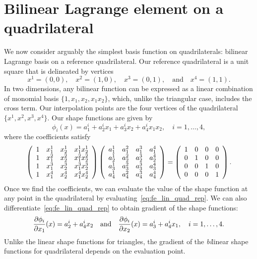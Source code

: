 \section{Bilinear Lagrange element on a quadrilateral}
We now consider arguably the simplest basis function on quadrilaterals: bilinear Lagrange basis on a reference quadrilateral.  Our reference quadrilateral is a unit square that is delineated by vertices
\begin{equation*}
  x^1 = (0,0), \quad x^2 = (1,0), \quad x^3 = (0,1), \quad \text{and} \quad x^4 = (1,1).
\end{equation*}
In two dimensions, any bilinear function can be expressed as a linear combination of monomial basis $\{ 1, x_1, x_2, x_1 x_2 \}$, which, unlike the triangular case, includes the cross term. Our interpolation points are the four vertices of the quadrilateral $\{ x^1, x^2, x^3, x^4 \}$.  Our shape functions are given by 
\begin{equation}
  \phi_i(x) = a_1^i + a_2^i x_1 + a_3^i x_2 + a_4^i x_1 x_2, \quad i = 1,\dots,4,
  \label{eq:fe_lin_quad_rep}
\end{equation}
where the coefficients satisfy
\begin{equation*}
  \bmat{cccc}
  1 & x_1^1 & x_2^1 & x_1^1 x_2^1 \\
  1 & x_1^2 & x_2^2 & x_1^2 x_2^2 \\
  1 & x_1^3 & x_2^3 & x_1^3 x_2^3 \\
  1 & x_1^4 & x_2^4 & x_1^4 x_2^4 \\
  \emat
  \bmat{cccc}
  a_1^1 & a_1^2 & a_1^3 & a_1^4 \\
  a_2^1 & a_2^2 & a_2^3 & a_2^4 \\
  a_3^1 & a_3^2 & a_3^3 & a_3^4 \\
  a_4^1 & a_4^2 & a_4^3 & a_4^4 \\
  \emat
  =
  \bmat{cccc}
  1 & 0 & 0 & 0 \\
  0 & 1 & 0 & 0 \\
  0 & 0 & 1 & 0 \\
  0 & 0 & 0 & 1
  \emat.
\end{equation*}
Once we find the coefficients, we can evaluate the value of the shape function at any point in the quadrilateral by evaluating~\eqref{eq:fe_lin_quad_rep}. We can also differentiate~\eqref{eq:fe_lin_quad_rep} to obtain gradient of the shape functions:
\begin{equation*}
  \pp{\phi_i}{x_1}(x) = a_2^i + a_4^ix_2
  \quad \text{and} \quad
  \pp{\phi_i}{x_2}(x) = a_3^i + a_4^ix_1, \quad i = 1,\dots,4.
\end{equation*}
Unlike the linear shape functions for triangles, the gradient of the \emph{bi}linear shape functions for quadrilateral depends on the evaluation point.

